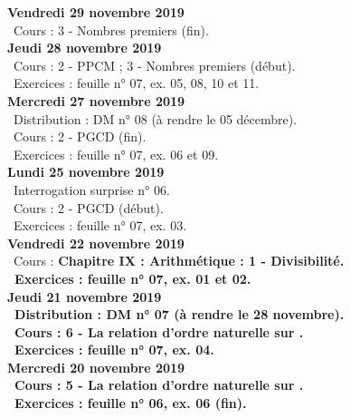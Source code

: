 \documentclass[12pt,a4paper]{article}
\begin{document}
\noindent\textbf{Vendredi 29 novembre 2019}\\
\bu\ Cours : 3 - Nombres premiers (fin).\vspace{.4cm}\\


\noindent\textbf{Jeudi 28 novembre 2019}\\
\bu\ Cours : 2 - PPCM ; 3 - Nombres premiers (début).\\
\bu\ Exercices : feuille n° 07, ex. 05, 08, 10 et 11.\vspace{.4cm}\\
  
\noindent\textbf{\bf Mercredi 27 novembre 2019}\\
\bu\ Distribution : DM n° 08 (à rendre le 05 décembre).\\
\bu\ Cours : 2 - PGCD (fin).\\
\bu\ Exercices : feuille n° 07, ex. 06 et 09.\vspace{.4cm}\\

\noindent\textbf{Lundi 25 novembre 2019}\\
\bu\ Interrogation surprise n° 06.\\
\bu\ Cours : 2 - PGCD (début).\\
\bu\ Exercices : feuille n° 07, ex. 03.\vspace{.4cm}\\ 

\noindent\textbf{Vendredi 22 novembre 2019}\\
\bu\ Cours : \bf Chapitre IX \rm : Arithmétique : 1 - Divisibilité.\\
\bu\ Exercices : feuille n° 07, ex. 01 et 02.\vspace{.4cm}\\ 

\noindent\textbf{Jeudi 21 novembre 2019}\\
\bu\ Distribution : DM n° 07 (à rendre le 28 novembre).\\
\bu\ Cours : 6 - La relation d'ordre naturelle sur \R.\\
\bu\ Exercices : feuille n° 07, ex. 04.\vspace{.4cm}\\ 

\noindent\textbf{\bf Mercredi 20 novembre 2019}\\
\bu\ Cours : 5 - La relation d'ordre naturelle sur \N.\\
\bu\ Exercices : feuille n° 06, ex. 06 (fin).\vspace{.4cm}\\ 
\end{document}
